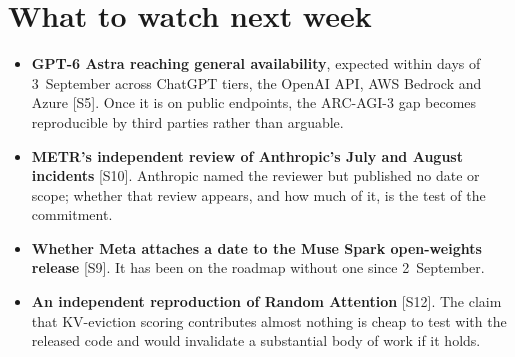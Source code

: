 \documentclass[11pt,a4paper]{article}
\newcommand{\srcref}[1]{\textcolor{brandaccent}{[S#1]}}
\begin{document}
\section{What to watch next week}
\begin{itemize}
  \item \textbf{GPT-6 Astra reaching general availability}, expected within days of
        3~September across ChatGPT tiers, the OpenAI API, AWS Bedrock and Azure
        \srcref{5}. Once it is on public endpoints, the ARC-AGI-3 gap becomes reproducible
        by third parties rather than arguable.
  \item \textbf{METR's independent review of Anthropic's July and August incidents}
        \srcref{10}. Anthropic named the reviewer but published no date or scope; whether
        that review appears, and how much of it, is the test of the commitment.
  \item \textbf{Whether Meta attaches a date to the Muse Spark open-weights release}
        \srcref{9}. It has been on the roadmap without one since 2~September.
  \item \textbf{An independent reproduction of Random Attention} \srcref{12}. The claim
        that KV-eviction scoring contributes almost nothing is cheap to test with the
        released code and would invalidate a substantial body of work if it holds.
\end{itemize}

\end{document}
